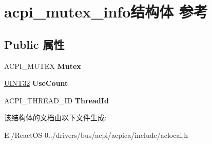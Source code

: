 \hypertarget{structacpi__mutex__info}{}\section{acpi\+\_\+mutex\+\_\+info结构体 参考}
\label{structacpi__mutex__info}
\subsection*{Public 属性}
\begin{DoxyCompactItemize}
\item 
\mbox{\label{structacpi__mutex__info_a7661579ac63226d82bac5e7edc767668}} 
A\+C\+P\+I\+\_\+\+M\+U\+T\+EX {\bfseries Mutex}
\item 
\mbox{\label{structacpi__mutex__info_a0f1f9cac194fec8afaa78f41b35ab663}} 
\hyperlink{_processor_bind_8h_ae1e6edbbc26d6fbc71a90190d0266018}{U\+I\+N\+T32} {\bfseries Use\+Count}
\item 
\mbox{\label{structacpi__mutex__info_a4b49c46084be219ccdc43f323d4f2368}} 
A\+C\+P\+I\+\_\+\+T\+H\+R\+E\+A\+D\+\_\+\+ID {\bfseries Thread\+Id}
\end{DoxyCompactItemize}


该结构体的文档由以下文件生成\+:\begin{DoxyCompactItemize}
\item 
E\+:/\+React\+O\+S-\/0../drivers/bus/acpi/acpica/include/aclocal.\+h\end{DoxyCompactItemize}

